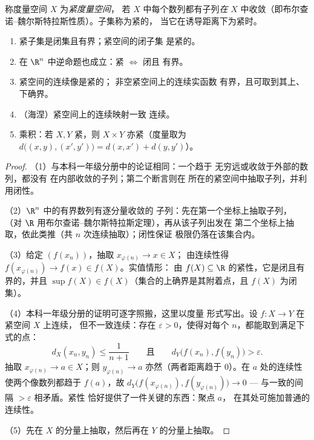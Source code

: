 \begin{definition}\label{def:b2:metric:compact}
称度量空间 $X$ 为\emph{紧度量空间}，
若 $X$ 中每个数列都有子列\emph{在}
$X$ 中收敛（即布尔查诺–魏尔斯特拉斯性质）。子集称为紧的，
当它在诱导距离下为紧时。
\end{definition}

\begin{theorem}[基本性质]\label{thm:b2:metric:compactprops}
\begin{enumerate}
  \item 紧子集是闭集且有界；紧空间的闭子集
        是紧的。
  \item 在 $\R^n$ 中逆命题也成立：紧 $\iff$ 闭且
        有界。
  \item 紧空间的连续像是紧的；
        非空紧空间上的连续实函数
        有界，且可取到其上、下确界。
  \item （海涅）紧空间上的连续映射一致
        连续。
  \item 乘积：若 $X, Y$ 紧，则 $X \times Y$ 亦紧（度量取为
        $d\bigl((x,y),(x',y')\bigr) = d(x,x') + d(y,y')$）。
\end{enumerate}
\end{theorem}

\begin{proof}
（1）与本科一年级分册中的论证相同：一个趋于%
无穷远或收敛于外部的数列，都没有
在内部收敛的子列；第二个断言则在
所在的紧空间中抽取子列，并利用闭性。

（2）$\R^n$ 中的有界数列有逐分量收敛的
子列：先在第一个坐标上抽取子列，
（对 $\R$ 用布尔查诺–魏尔斯特拉斯定理），再从该子列出发在
第二个坐标上抽取，依此类推（共 $n$ 次连续抽取）；闭性保证
极限仍落在该集合内。

（3）给定 $(f(x_n))$，抽取 $x_{\varphi(n)} \to x \in X$；
由连续性得 $f(x_{\varphi(n)}) \to f(x) \in f(X)$。实值情形：
由 $f(X) \subseteq \R$ 的紧性，它是闭且有界的，并且
$\sup f(X) \in f(X)$（集合的上确界是其附着点，且
$f(X)$ 为闭集）。

（4）本科一年级分册的证明可逐字照搬，这里以度量
形式写出。设 $f \colon X \to Y$ 在紧空间 $X$ 上连续，
但不一致连续：存在 $\varepsilon > 0$，使得对每个
$n$，都能取到满足下式的点：
\[
d_X(x_n, y_n) \leq \frac{1}{n+1}
\qquad\text{且}\qquad
d_Y\bigl(f(x_n), f(y_n)\bigr) > \varepsilon .
\]
抽取 $x_{\varphi(n)} \to a \in X$；则 $y_{\varphi(n)} \to
a$ 亦然（两者距离趋于 $0$）。在 $a$ 处的连续性
使两个像数列都趋于 $f(a)$，故
$d_Y\bigl(f(x_{\varphi(n)}), f(y_{\varphi(n)})\bigr) \to 0$ ---
与一致的间隔 $> \varepsilon$ 相矛盾。紧性
恰好提供了一件关键的东西：聚点 $a$，
在其处可施加普通的连续性。

（5）先在 $X$ 的分量上抽取，然后再在
$Y$ 的分量上抽取。
\end{proof}

